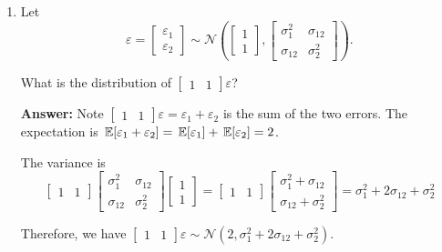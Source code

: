 \documentclass[12pt]{article}
\newcommand{\answer}[1]{{\color{blue_winged_teal}\textbf{Answer:} #1}}
\begin{document}
\begin{enumerate}
  \answer{
    A and b; B and a; C and c. You can verify these by doing e.g. $Ab = bA = I$.
  }


  \bigskip\bigskip
  \item Let $$
    \varepsilon = \begin{bmatrix}\varepsilon_1 \\ \varepsilon_2\end{bmatrix} \sim \mathcal{N}\left( \begin{bmatrix}1 \\ 1\end{bmatrix}, \begin{bmatrix}\sigma_1^2 & \sigma_{12} \\ \sigma_{12} & \sigma_2^2\end{bmatrix} \right).
  $$
  
  What is the distribution of $\begin{bmatrix} 1 & 1 \end{bmatrix} \varepsilon$?

  \answer{
    Note $\begin{bmatrix} 1 & 1 \end{bmatrix} \varepsilon = \varepsilon_1 + \varepsilon_2$ is the sum of the two errors. The expectation is $\expec{\varepsilon_1 + \varepsilon_2} = \expec{\varepsilon_1} + \expec{\varepsilon_2} = 2$.

    The variance is 
    $$
      \begin{bmatrix} 1 & 1 \end{bmatrix} 
      \begin{bmatrix}\sigma_1^2 & \sigma_{12} \\ \sigma_{12} & \sigma_2^2\end{bmatrix}
      \begin{bmatrix} 1 \\ 1 \end{bmatrix} = 
      \begin{bmatrix} 1 & 1 \end{bmatrix} 
      \begin{bmatrix}\sigma_1^2 + \sigma_{12} \\ \sigma_{12} + \sigma_2^2\end{bmatrix} = \sigma_1^2 + 2\sigma_{12} + \sigma_2^2
    $$

    Therefore, we have $\begin{bmatrix} 1 & 1 \end{bmatrix} \varepsilon \sim \mathcal{N}(2, \sigma_1^2 + 2\sigma_{12} + \sigma_2^2)$.
  }


\end{enumerate}
\end{document}

